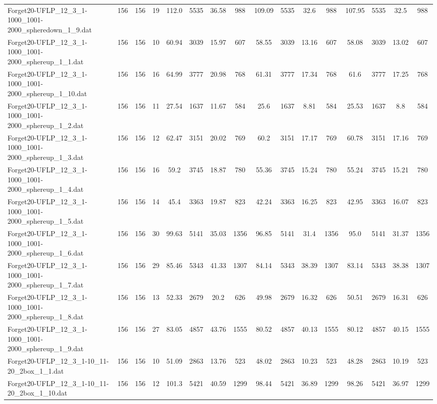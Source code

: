 \begin{sidewaystable}[!ht]
{\begin{tabular}{lccccccccccccccc}
Forget20-UFLP\_12\_3\_1-1000\_1001-2000\_spheredown\_1\_9.dat & 156 & 156 & 19 & 112.0 & 5535 & 36.58 & 988 & 109.09 & 5535 & 32.6 & 988 & 107.95 & 5535 &  \textcolor{blue2}{32.5} & 988 \\
Forget20-UFLP\_12\_3\_1-1000\_1001-2000\_sphereup\_1\_1.dat & 156 & 156 & 10 & 60.94 & 3039 & 15.97 & 607 & 58.55 & 3039 & 13.16 & 607 & 58.08 & 3039 &  \textcolor{blue2}{13.02} & 607 \\
Forget20-UFLP\_12\_3\_1-1000\_1001-2000\_sphereup\_1\_10.dat & 156 & 156 & 16 & 64.99 & 3777 & 20.98 & 768 & 61.31 & 3777 & 17.34 & 768 & 61.6 & 3777 & 17.25 & 768 \\
Forget20-UFLP\_12\_3\_1-1000\_1001-2000\_sphereup\_1\_2.dat & 156 & 156 & 11 & 27.54 & 1637 & 11.67 & 584 & 25.6 & 1637 & 8.81 & 584 & 25.53 & 1637 &  \textcolor{blue2}{8.8} & 584 \\
Forget20-UFLP\_12\_3\_1-1000\_1001-2000\_sphereup\_1\_3.dat & 156 & 156 & 12 & 62.47 & 3151 & 20.02 & 769 & 60.2 & 3151 & 17.17 & 769 & 60.78 & 3151 & 17.16 & 769 \\
Forget20-UFLP\_12\_3\_1-1000\_1001-2000\_sphereup\_1\_4.dat & 156 & 156 & 16 & 59.2 & 3745 & 18.87 & 780 & 55.36 & 3745 & 15.24 & 780 & 55.24 & 3745 & 15.21 & 780 \\
Forget20-UFLP\_12\_3\_1-1000\_1001-2000\_sphereup\_1\_5.dat & 156 & 156 & 14 & 45.4 & 3363 & 19.87 & 823 & 42.24 & 3363 & 16.25 & 823 & 42.95 & 3363 & 16.07 & 823 \\
Forget20-UFLP\_12\_3\_1-1000\_1001-2000\_sphereup\_1\_6.dat & 156 & 156 & 30 & 99.63 & 5141 & 35.03 & 1356 & 96.85 & 5141 & 31.4 & 1356 & 95.0 & 5141 & 31.37 & 1356 \\
Forget20-UFLP\_12\_3\_1-1000\_1001-2000\_sphereup\_1\_7.dat & 156 & 156 & 29 & 85.46 & 5343 & 41.33 & 1307 & 84.14 & 5343 & 38.39 & 1307 & 83.14 & 5343 &  \textcolor{blue2}{38.38} & 1307 \\
Forget20-UFLP\_12\_3\_1-1000\_1001-2000\_sphereup\_1\_8.dat & 156 & 156 & 13 & 52.33 & 2679 & 20.2 & 626 & 49.98 & 2679 & 16.32 & 626 & 50.51 & 2679 &  \textcolor{blue2}{16.31} & 626 \\
Forget20-UFLP\_12\_3\_1-1000\_1001-2000\_sphereup\_1\_9.dat & 156 & 156 & 27 & 83.05 & 4857 & 43.76 & 1555 & 80.52 & 4857 & 40.13 & 1555 & 80.12 & 4857 & 40.15 & 1555 \\
Forget20-UFLP\_12\_3\_1-10\_11-20\_2box\_1\_1.dat & 156 & 156 & 10 & 51.09 & 2863 & 13.76 & 523 & 48.02 & 2863 & 10.23 & 523 & 48.28 & 2863 &  \textcolor{blue2}{10.19} & 523 \\
Forget20-UFLP\_12\_3\_1-10\_11-20\_2box\_1\_10.dat & 156 & 156 & 12 & 101.3 & 5421 & 40.59 & 1299 & 98.44 & 5421 & 36.89 & 1299 & 98.26 & 5421 & 36.97 & 1299 \\

\end{tabular}}
\end{sidewaystable}
